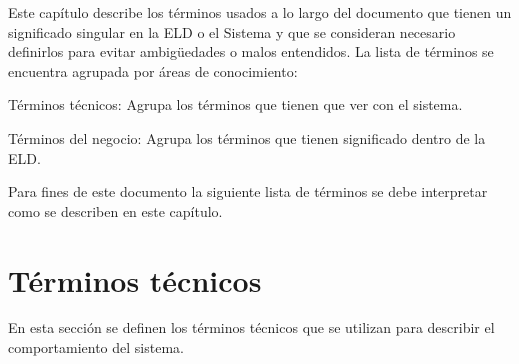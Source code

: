 \label{sec:glosario}
    Este capítulo describe los términos usados a lo largo del documento que tienen un significado singular en la ELD o el Sistema y que se consideran necesario definirlos para evitar ambigüedades o malos entendidos.
    La lista de términos se encuentra agrupada por áreas de conocimiento:
\begin{Citemize}
    \item Términos técnicos: Agrupa los términos que tienen que ver con el sistema.
    \item Términos del negocio: Agrupa los términos que tienen significado dentro de la ELD.
\end{Citemize}

    Para fines de este documento la siguiente lista de términos se debe interpretar como se describen en este capítulo.

   
\section{Términos técnicos}
\label{gls:terminosTecnicos}

  En esta sección se definen los términos técnicos que se utilizan para describir el comportamiento del sistema.
  
